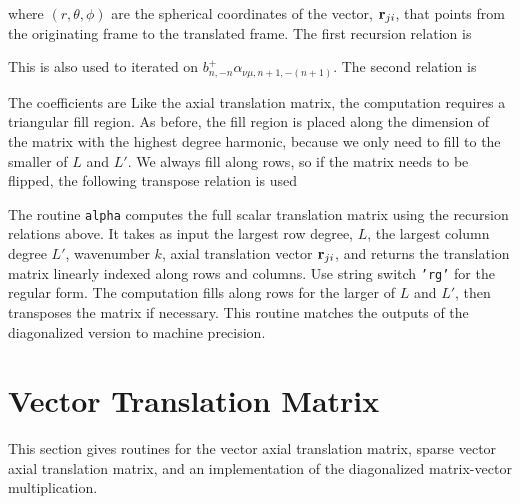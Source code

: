 \noindent where $(r,\theta,\phi)$ are the spherical coordinates of the vector, $\mathbf{r}_{ji}$, that points from the originating frame to the translated frame. The first recursion relation is

This is also used to iterated on $b_{n,-n}^{+} \alpha_{\nu\mu,n+1,-(n+1)} $. The second relation is 

The coefficients are 
Like the axial translation matrix, the computation requires a triangular fill region. As before, the fill region is placed along the dimension of the matrix with the highest degree harmonic, because we only need to fill to the smaller of $L$ and $L'$. We always fill along rows, so if the matrix needs to be flipped, the following transpose relation is used
   
The routine \texttt{alpha} computes the full scalar translation matrix using the recursion relations above.  It takes as input the largest row degree, $L$, the largest column degree $L'$, wavenumber $k$, axial translation vector $\mathbf{r}_{ji}$, and returns the translation matrix linearly indexed along rows and columns. Use string switch \texttt{'rg'} for the regular form. The computation fills along rows for the larger of $L$ and $L'$, then transposes the matrix if necessary. This routine matches the outputs of the diagonalized version to machine precision. 


{\footnotesize
{}
}



\clearpage
\newpage

\section{Vector Translation Matrix}

This section gives routines for the vector axial translation matrix, sparse vector axial translation matrix, and an implementation of the diagonalized matrix-vector multiplication.  
\vspace{-1mm}
